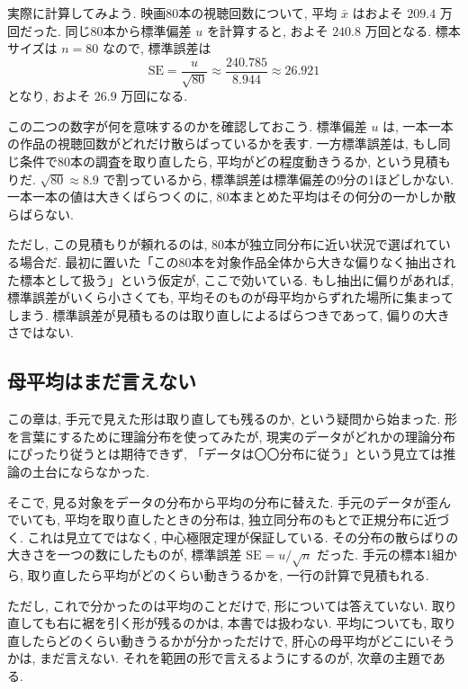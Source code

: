     実際に計算してみよう.
    映画80本の視聴回数について, 平均 $\bar{x}$ はおよそ $209.4$ 万回だった.
    同じ80本から標準偏差 $u$ を計算すると, およそ $240.8$ 万回となる.
    標本サイズは $n = 80$ なので, 標準誤差は
    \[
      \mathrm{SE} = \frac{u}{\sqrt{80}} \approx \frac{240.785}{8.944} \approx 26.921
    \]
    となり, およそ $26.9$ 万回になる.

    この二つの数字が何を意味するのかを確認しておこう.
    標準偏差 $u$ は, 一本一本の作品の視聴回数がどれだけ散らばっているかを表す.
    一方標準誤差は, もし同じ条件で80本の調査を取り直したら, 平均がどの程度動きうるか, という見積もりだ.
    $\sqrt{80} \approx 8.9$ で割っているから, 標準誤差は標準偏差の9分の1ほどしかない.
    一本一本の値は大きくばらつくのに, 80本まとめた平均はその何分の一かしか散らばらない.

    ただし, この見積もりが頼れるのは, 80本が独立同分布に近い状況で選ばれている場合だ.
    最初に置いた「この80本を対象作品全体から大きな偏りなく抽出された標本として扱う」という仮定が, ここで効いている.
    もし抽出に偏りがあれば, 標準誤差がいくら小さくても, 平均そのものが母平均からずれた場所に集まってしまう.
    標準誤差が見積もるのは取り直しによるばらつきであって, 偏りの大きさではない.

  \subsection{母平均はまだ言えない}

    この章は, 手元で見えた形は取り直しても残るのか, という疑問から始まった.
    形を言葉にするために理論分布を使ってみたが, 現実のデータがどれかの理論分布にぴったり従うとは期待できず, 「データは〇〇分布に従う」という見立ては推論の土台にならなかった.

    そこで, 見る対象をデータの分布から平均の分布に替えた.
    手元のデータが歪んでいても, 平均を取り直したときの分布は, 独立同分布のもとで正規分布に近づく.
    これは見立てではなく, 中心極限定理が保証している.
    その分布の散らばりの大きさを一つの数にしたものが, 標準誤差 $\mathrm{SE} = u/\sqrt{n}$ だった.
    手元の標本1組から, 取り直したら平均がどのくらい動きうるかを, 一行の計算で見積もれる.

    ただし, これで分かったのは平均のことだけで, 形については答えていない.
    取り直しても右に裾を引く形が残るのかは, 本書では扱わない.
    平均についても, 取り直したらどのくらい動きうるかが分かっただけで, 肝心の母平均がどこにいそうかは, まだ言えない.
    それを範囲の形で言えるようにするのが, 次章の主題である.

